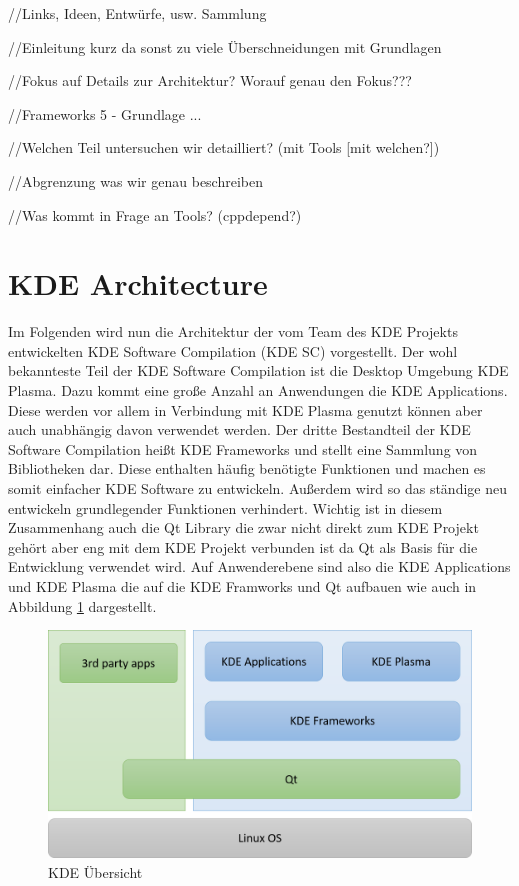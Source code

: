 %
	
//Links, Ideen, Entwürfe, usw. Sammlung

//Einleitung kurz da sonst zu viele Überschneidungen mit Grundlagen

//Fokus auf Details zur Architektur? Worauf genau den Fokus???

//Frameworks 5 - Grundlage ...

//Welchen Teil untersuchen wir detailliert? (mit Tools [mit welchen?])

//Abgrenzung was wir genau beschreiben

//Was kommt in Frage an Tools? (cppdepend?)

\section{KDE Architecture}
Im Folgenden wird nun die Architektur der vom Team des KDE Projekts entwickelten KDE Software Compilation (KDE SC) vorgestellt. Der wohl bekannteste Teil der KDE Software Compilation ist die Desktop Umgebung KDE Plasma. Dazu kommt eine große Anzahl an Anwendungen die KDE Applications. Diese werden vor allem in Verbindung mit KDE Plasma genutzt können aber auch unabhängig davon verwendet werden. Der dritte Bestandteil der KDE Software Compilation heißt KDE Frameworks und stellt eine Sammlung von Bibliotheken dar. Diese enthalten häufig benötigte Funktionen und machen es somit einfacher KDE Software zu entwickeln. Außerdem wird so das ständige neu entwickeln grundlegender Funktionen verhindert. Wichtig ist in diesem Zusammenhang auch die Qt Library die zwar nicht direkt zum KDE Projekt gehört aber eng mit dem KDE Projekt verbunden ist da Qt als Basis für die Entwicklung verwendet wird. Auf Anwenderebene sind also die KDE Applications und KDE Plasma die auf die KDE Framworks und Qt aufbauen wie auch in Abbildung \ref{fig:kde_overview} dargestellt.
\begin{figure}[h]
\centering
\includegraphics[width=0.9\columnwidth]{images/KDE_Aufbau.png}
\caption{KDE Übersicht}
\label{fig:kde_overview}
\end{figure}

